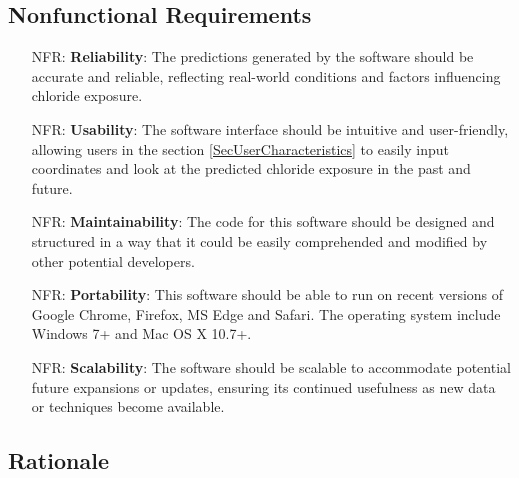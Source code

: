 \documentclass[12pt]{article}
\newcounter{nfrnum} %
\begin{document}
\subsection{Nonfunctional Requirements}

\noindent \begin{itemize}

\item[NFR\refstepcounter{nfrnum}\thenfrnum \label{NFR_Reliability}:]   \textbf{Reliability}: The predictions generated by the software should be accurate and reliable, reflecting real-world conditions and factors influencing chloride exposure.

\item[NFR\refstepcounter{nfrnum}\thenfrnum \label{NFR_Usability}:] \textbf{Usability}: The software interface should be intuitive and user-friendly, allowing users in the section \ref{SecUserCharacteristics} to easily input coordinates and look at the predicted chloride exposure in the past and future.

\item[NFR\refstepcounter{nfrnum}\thenfrnum \label{NFR_Maintainability}:] \textbf{Maintainability}: The code for this software should be designed and structured in a way that it could be easily comprehended and modified by other potential developers.

\item[NFR\refstepcounter{nfrnum}\thenfrnum \label{NFR_Portability}:]  \textbf{Portability}: This software should be able to run on recent versions of Google Chrome, Firefox, MS Edge and Safari. The operating system include Windows 7+ and Mac OS X 10.7+.

\item[NFR\refstepcounter{nfrnum}\thenfrnum \label{NFR_Scalability}:]   \textbf{Scalability}: The software should be scalable to accommodate potential future expansions or updates, ensuring its continued usefulness as new data or techniques become available.

\end{itemize}

\subsection{Rationale}
\end{document}
